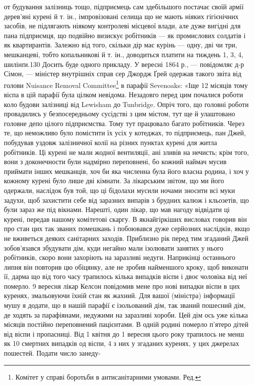 \parcont{}  %
от будування залізниць тощо, підприємець сам здебільшого постачає
своїй армії дерев’яні курені й т. ін., імпровізовані селища
що не мають ніяких гігієнічних засобів, не підлягають ніякому
контролеві місцевої влади, але дуже вигідні для пана підприємця,
що подвійно визискує робітників — як промислових солдатів
і як квартирантів. Залежно від того, скільки дір має курінь —
одну, дві чи три, мешканцеві, тобто копальникові й т. ін., доводиться
платити на тиждень 1, 3, 4, шилінґи.130 Досить буде одного
прикладу. У вересні 1864 р., — повідомляє д-р Сімон, — міністер
внутрішніх справ сер Джордж Ґрей одержав такого звіта
від голови Nuisance Removal Committee\footnote*{
Комітет у справі боротьби в антисанітарними умовами. Ред.
} в парафії Sevenoaks:
«Іще 12 місяців тому віспа в цій парафії була цілком невідома.
Незадовго перед цим почалися роботи коло будови залізниці
від Lewisham до Tunbridge. Опріч того, що головні роботи провадились
у безпосередньому сусідстві з цим містом, тут ще й
улаштовано головне депо цілого підприємства. Тому тут працювало
багато робітників. Через те, що неможливо було помістити
їх усіх у котеджах, то підприємець, пан Джей, побудував уздовж
залізничної колії на різних пунктах курені для житла робітників.
Ці курені не мали жодної вентиляції, ані зливів на нечисть;
крім того, вони з доконечности були надмірно переповнені,
бо кожний наймач мусив приймати інших мешканців, хоч би
яка численна була його власна родина, і хоч у кожному курені
було лише дві кімнати. За лікарським звітом, що ми його одержали,
наслідок був той, що ці бідолахи мусили ночами зносити
всі муки задухи, щоб захистити себе від заразних випарів з брудних
калюж і кльозетів, що були зараз же під вікнами. Нарешті,
один лікар, що мав нагоду відвідати ці курені, передав нашому
комітетові скаргу. В якнайгіркіших висловах говорив він про
стан цих так званих помешкань і побоювався дуже серйозних
наслідків, якщо не вживеться деяких санітарних заходів. Приблизно
рік перед тим згаданий Джей зобов’язався збудувати дім,
куди негайно мали ізолювати занятих у нього робітників, скоро
вони захоріють на заразливі недуги. Наприкінці останнього
липня він повторив цю обіцянку, але не зробив найменшого
кроку, щоб виконати її, дарма що від того часу трапилось кілька
випадків віспи і двоє чоловіка від неї померло. 9 вересня лікар
Келсон повідомив мене про нові випадки віспи в цих куренях,
змальовуючи їхній стан як жахний. Для вашої (міністра) інформації
мушу я додати, що в нашій парафії є ізольований дім, так
званий пошесний дім, де ходять за парафіянами, недужими на
заразливі хороби. Цей дім ось уже кілька місяців постійно переповнений
пацієнтами. В одній родині померло п’ятеро дітей від
віспи і пропасниці. Від 1 квітня до 1 вересня цього року трапилось
не менш як 10 смертних випадків од віспи, 4 з них у згаданих
куренях, у цих джерелах пошестей. Подати число занеду-

